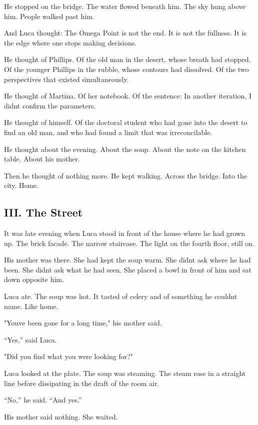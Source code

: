 \documentclass[
  ngerman,
]{article}
\begin{document}
He stopped on the bridge. The water flowed beneath him. The sky hung
above him. People walked past him.

And Luca thought: The Omega Point is not the end. It is not the
fullness. It is the edge where one stops making decisions.

He thought of Phillips. Of the old man in the desert, whose breath had
stopped. Of the younger Phillips in the rubble, whose contours had
dissolved. Of the two perspectives that existed simultaneously.

He thought of Martina. Of her notebook. Of the sentence: In another
iteration, I didn\textquotesingle t confirm the parameters.

He thought of himself. Of the doctoral student who had gone into the
desert to find an old man, and who had found a limit that was
irreconcilable.

He thought about the evening. About the soup. About the note on the
kitchen table. About his mother.

Then he thought of nothing more. He kept walking. Across the bridge.
Into the city. Home.

\subsection{III. The Street}\label{iii.-the-street}

It was late evening when Luca stood in front of the house where he had
grown up. The brick facade. The narrow staircase. The light on the
fourth floor, still on.

His mother was there. She had kept the soup warm. She
didn\textquotesingle t ask where he had been. She didn\textquotesingle t
ask what he had seen. She placed a bowl in front of him and sat down
opposite him.

Luca ate. The soup was hot. It tasted of celery and of something he
couldn\textquotesingle t name. Like home.

"You\textquotesingle ve been gone for a long time," his mother said.

``Yes,'' said Luca.

"Did you find what you were looking for?"

Luca looked at the plate. The soup was steaming. The steam rose in a
straight line before dissipating in the draft of the room air.

``No,'' he said. ``And yes.''

His mother said nothing. She waited.
\end{document}
